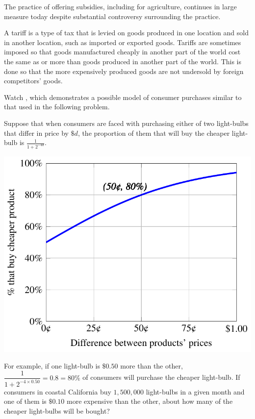 \documentclass{ximera}
\begin{document}
The practice of offering subsidies, including for agriculture, continues in large measure today despite substantial controversy surrounding the practice.

A tariff is a type of tax that is levied on goods produced in one location and sold in another location, such as imported or exported goods. Tariffs are sometimes imposed so that goods manufactured cheaply in another part of the world cost the same as or more than goods produced in another part of the world. This is done so that the more expensively produced goods are not undersold by foreign competitors' goods.

\begin{question}
Watch , which demonstrates a possible model of consumer purchases similar to that used in the following problem.

Suppose that when consumers are faced with purchasing either of two light-bulbs that differ in price by $\$d$, the proportion of them that will buy the cheaper light-bulb is $\displaystyle \frac{1}{1+2^{-4d}}$.
\begin{image}
\includegraphics{buyingproducts.pdf}
\end{image}
For example, if one light-bulb is $\$0.50$ more than the other, $\dfrac{1}{1+2^{-4\times 0.50}}=0.8=80\%$ of consumers will purchase the cheaper light-bulb.
If consumers in coastal California buy $1,500,000$ light-bulbs in a given month and one of them is $\$0.10$ more expensive than the other, about how many of the cheaper light-bulbs will be bought?



\end{question}
\end{document}
